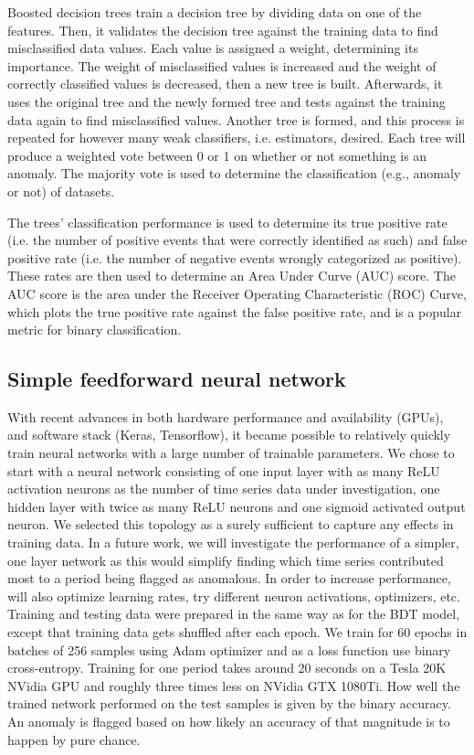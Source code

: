 \documentclass[5p]{elsarticle}
\begin{document}
Boosted decision trees train a decision tree by dividing data on one of the features. Then, it validates the decision tree against the training data to find misclassified data values. Each value is assigned a weight, determining its importance. The weight of misclassified values is increased and the weight of correctly classified values is decreased, then a new tree is built. Afterwards, it uses the original tree and the newly formed tree and tests against the training data again to find misclassified values. Another tree is formed, and this process is repeated for however many weak classifiers, i.e. estimators, desired. Each tree will produce a weighted vote between 0 or 1 on whether or not something is an anomaly. The majority vote is used to determine the classification (e.g., anomaly or not) of datasets.

The trees' classification performance is used to determine its true positive rate (i.e. the number of positive events that were correctly identified as such) and false positive rate (i.e. the number of negative events wrongly categorized as positive). These rates are then used to determine an Area Under Curve (AUC) score. The AUC score is the area under the Receiver Operating Characteristic (ROC) Curve, which plots the true positive rate against the false positive rate, and is a popular metric for binary classification.

\subsection{Simple feedforward neural network}

With recent advances in both hardware performance and availability (GPUs), and software stack (Keras, Tensorflow), it became possible to relatively quickly train neural networks with a large number of trainable parameters. We chose to start with a neural network consisting of one input layer with as many ReLU activation neurons as the number of time series data under investigation, one hidden layer with twice as many ReLU neurons and one sigmoid activated output neuron. We selected this topology as a surely sufficient to capture any effects in training data. In a future work, we will investigate the performance of a simpler, one layer network as this would simplify finding which time series contributed most to a period being flagged as anomalous. In order to increase performance, will also optimize learning rates, try different neuron activations, optimizers,  etc.  
Training and testing data were prepared in the same way as for the BDT model, except that training data gets shuffled after each epoch. We train for 60 epochs in batches of 256 samples using Adam optimizer \cite{jedanaest} and as a loss function use binary cross-entropy. Training for one period takes around 20 seconds on a Tesla 20K NVidia GPU and roughly three times less on NVidia GTX 1080Ti. How well the trained network performed on the test samples is given by the binary accuracy. An anomaly is flagged based on how likely an accuracy of that magnitude is to happen by pure chance.
\end{document}
